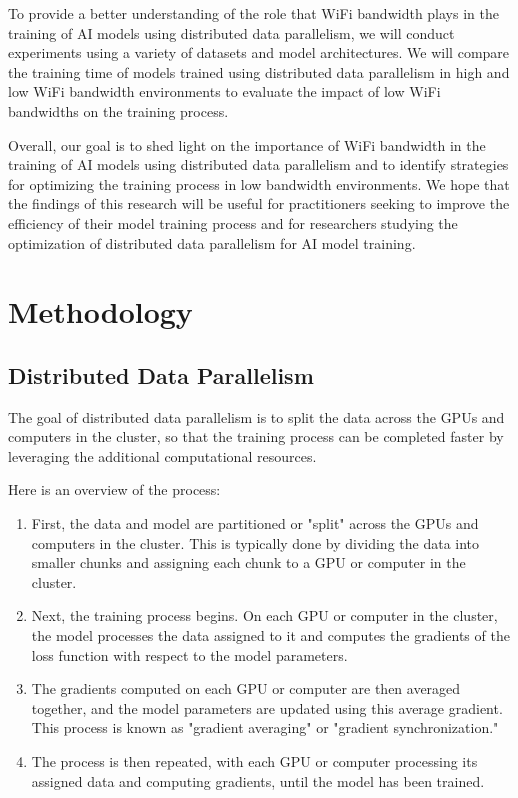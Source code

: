 \documentclass[11pt]{article}
\begin{document}
To provide a better understanding of the role that WiFi bandwidth plays in the training of AI models using distributed data parallelism, we will conduct experiments using a variety of datasets and model architectures. We will compare the training time of models trained using distributed data parallelism in high and low WiFi bandwidth environments to evaluate the impact of low WiFi bandwidths on the training process.

Overall, our goal is to shed light on the importance of WiFi bandwidth in the training of AI models using distributed data parallelism and to identify strategies for optimizing the training process in low bandwidth environments. We hope that the findings of this research will be useful for practitioners seeking to improve the efficiency of their model training process and for researchers studying the optimization of distributed data parallelism for AI model training.

\section{Methodology}
\subsection{Distributed Data Parallelism}
The goal of distributed data parallelism is to split the data across the GPUs and computers in the cluster, so that the training process can be completed faster by leveraging the additional computational resources.

Here is an overview of the process:

\begin{enumerate}
	\item First, the data and model are partitioned or "split" across the GPUs and computers in 			  the cluster. This is typically done by dividing the data into smaller chunks and 	  				   assigning each chunk to a GPU or computer in the cluster.
	\item Next, the training process begins. On each GPU or computer in the cluster, the model 				  processes the data assigned to it and computes the gradients of the loss function with 		  respect to the model parameters.
	\newpage
	\item The gradients computed on each GPU or computer are then averaged together, and the 				  model parameters are updated using this average gradient. This process is known as 				  "gradient averaging" or "gradient synchronization."
	\item The process is then repeated, with each GPU or computer processing its assigned data 				  and computing gradients, until the model has been trained.
\end{enumerate}
\end{document}
